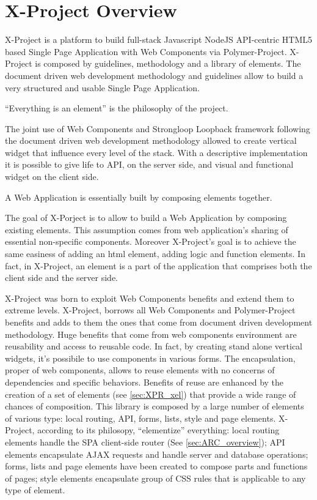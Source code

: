 \section{X-Project Overview}
\label{sec:XPR_xpr}

X-Project is a platform to build full-stack Javascript NodeJS API-centric HTML5 based Single Page Application with Web Components via Polymer-Project.
X-Project is composed by guidelines, methodology and a library of elements.
The document driven web development methodology and guidelines allow to build a very structured and usable Single Page Application.

``Everything is an element'' is the philosophy of the project.

The joint use of Web Components and Strongloop Loopback framework following the document driven web development methodology allowed to create vertical widget that influence every level of the stack. With a descriptive implementation it is possible to give life to API, on the server side, and visual and functional widget on the client side.

A Web Application is essentially built by composing elements together.

The goal of X-Porject is to allow to build a Web Application by composing existing elements. This assumption comes from web application's sharing of essential non-specific components.
Moreover X-Project's goal is to achieve the same easiness of adding an html element, adding logic and function elements.
In fact, in X-Project, an element is a part of the application that comprises both the client side and the server side.

X-Project was born to exploit Web Components benefits and extend them to extreme levels. X-Project, borrows all Web Components and Polymer-Project benefits and adds to them the ones that come from document driven development methodology.
Huge benefits that come from web components environment are reusability and access to reusable code. In fact, by creating stand alone vertical widgets, it's possibile to use components in various forms.
The encapsulation, proper of web components, allows to reuse elements with no concerns of dependencies and specific behaviors.
Benefits of reuse are enhanced by the creation of a set of elements (see \ref{sec:XPR_xel}) that provide a wide range of chances of composition.
This library is composed by a large number of elements of various type: local routing, API, forms, lists, style and page elements. X-Project, according to its philosopy, ``elementize'' everything: local routing elements handle the SPA client-side router (See \ref{sec:ARC_overview}); API elements encapsulate AJAX requests and handle server and database operations; forms, lists and page elements have been created to compose parts and functions of pages; style elements encapsulate group of CSS rules that is applicable to any type of element.


